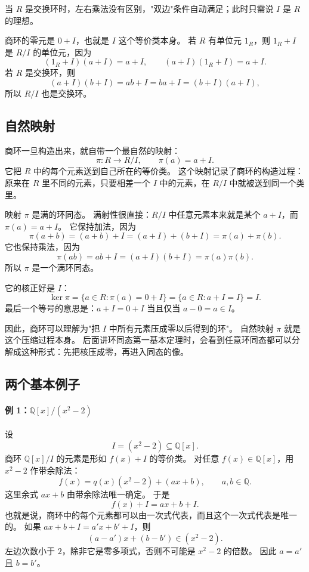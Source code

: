 当 $R$ 是交换环时，左右乘法没有区别，"双边"条件自动满足；此时只需说 $I$ 是 $R$ 的理想。

商环的零元是 $0+I$，也就是 $I$ 这个等价类本身。
若 $R$ 有单位元 $1_R$，则 $1_R+I$ 是 $R/I$ 的单位元，因为
\[
(1_R+I)(a+I)=a+I,\qquad (a+I)(1_R+I)=a+I.
\]
若 $R$ 是交换环，则
\[
(a+I)(b+I)=ab+I=ba+I=(b+I)(a+I),
\]
所以 $R/I$ 也是交换环。

\subsection{自然映射}\label{sec:canonical-map-quotient-ring}

商环一旦构造出来，就自带一个最自然的映射：
\[
\pi:R\to R/I,\qquad \pi(a)=a+I.
\]
它把 $R$ 中的每个元素送到自己所在的等价类。
这个映射记录了商环的构造过程：原来在 $R$ 里不同的元素，只要相差一个 $I$ 中的元素，在 $R/I$ 中就被送到同一个类里。

映射 $\pi$ 是满的环同态。
满射性很直接：$R/I$ 中任意元素本来就是某个 $a+I$，而 $\pi(a)=a+I$。
它保持加法，因为
\[
\pi(a+b)=(a+b)+I=(a+I)+(b+I)=\pi(a)+\pi(b).
\]
它也保持乘法，因为
\[
\pi(ab)=ab+I=(a+I)(b+I)=\pi(a)\pi(b).
\]
所以 $\pi$ 是一个满环同态。

它的核正好是 $I$：
\[
\ker\pi=\{a\in R:\pi(a)=0+I\}
=\{a\in R:a+I=I\}=I.
\]
最后一个等号的意思是：$a+I=0+I$ 当且仅当 $a-0=a\in I$。

因此，商环可以理解为"把 $I$ 中所有元素压成零以后得到的环"。
自然映射 $\pi$ 就是这个压缩过程本身。
后面讲环同态第一基本定理时，会看到任意环同态都可以分解成这种形式：先把核压成零，再进入同态的像。

\subsection{两个基本例子}\label{sec:quotient-ring-examples}

\paragraph*{例 1：$\mathbb Q[x]/(x^2-2)$}
设
\[
I=(x^2-2)\subseteq \mathbb Q[x].
\]
商环 $\mathbb Q[x]/I$ 的元素是形如 $f(x)+I$ 的等价类。
对任意 $f(x)\in\mathbb Q[x]$，用 $x^2-2$ 作带余除法：
\[
f(x)=q(x)(x^2-2)+(ax+b),
\qquad a,b\in\mathbb Q.
\]
这里余式 $ax+b$ 由带余除法唯一确定。
于是
\[
f(x)+I=ax+b+I.
\]
也就是说，商环中的每个元素都可以由一次式代表，而且这个一次式代表是唯一的。
如果 $ax+b+I=a'x+b'+I$，则
\[
(a-a')x+(b-b')\in (x^2-2).
\]
左边次数小于 $2$，除非它是零多项式，否则不可能是 $x^2-2$ 的倍数。
因此 $a=a'$ 且 $b=b'$。

